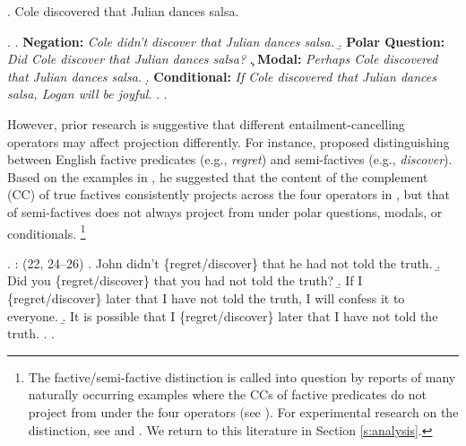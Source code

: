 \documentclass[a4paper,12pt,twoside]{article}
\begin{document}
    \ex.\label{ex:simple} Cole discovered that Julian dances salsa.

		\ex. \label{ex:family}
			\a. \label{ex:neg}
				{\bf Negation:} \hfill
				\emph{Cole didn't discover that Julian dances salsa.}
			\b. \label{ex:q}
				{\bf Polar Question:} \hfill
				\emph{Did Cole discover that Julian dances salsa?}
			\c. \label{ex:mod}
				{\bf Modal:} \hfill
				\emph{Perhaps Cole discovered that Julian dances salsa.}
			\d. \label{ex:cond}
				{\bf Conditional:} \hfill
				\emph{If Cole discovered that Julian dances salsa, Logan will be joyful.}
			\z.
		\z.

     However, prior research is suggestive that different entailment-cancelling operators may affect projection differently. For instance, \citet{karttunen_observations_1971} proposed distinguishing between English factive predicates (e.g., \textit{regret}) and semi-factives (e.g., \textit{discover}). Based on the examples in \Next, he suggested that the content of the complement (CC) of true factives consistently projects across the four operators in \Last, but that of semi-factives does not always project from under polar questions, modals, or conditionals.%
    \footnote{The factive/semi-factive distinction is called into question by reports of many naturally occurring examples where the CCs of factive predicates do not project from under the four operators (see \citealt{beaver_have_2010,de_marneffe_did_2012,demarneffe-etal-sub23}). For experimental research on the distinction, see \citealt{djaerv-etal2016} and \citealt{djarv_cognitive_2018}. We return to this literature in Section \ref{s:analysis}.
    }

    \ex. \citealt{karttunen_observations_1971}: (22, 24--26)
        \a. John didn't \{regret/discover\} that he had not told the truth.
        \b. Did you \{regret/discover\} that you had not told the truth?
        \b. If I \{regret/discover\} later that I have not told the truth, I will confess it to everyone.
        \b. It is possible that I \{regret/discover\} later that I have not told the truth.
        \z.
    \z.
\end{document}
